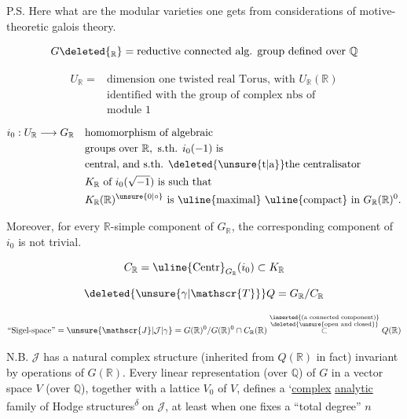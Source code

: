 P.S. Here what are the modular varieties one gets from considerations of motive-theoretic galois theory.

\[
G\deleted{_{\mathbb{R}}}
= \text{reductive connected alg. group defined over }\mathbb{Q}
\]

\[
\begin{aligned}
U_{\mathbb{R}}={}&\text{dimension one twisted real Torus, with }U_{\mathbb{R}}(\mathbb{R})\\
&\text{identified with the group of complex nbs of}\\
&\text{module }1
\end{aligned}
\]

\[
\begin{aligned}
i_0:U_{\mathbb{R}}\longrightarrow G_{\mathbb{R}}\quad &\text{homomorphism of algebraic}\\
&\text{groups over }\mathbb{R},\ \text{s.th. }i_0(-1)\text{ is}\\
&\text{central, and s.th. \deleted{\unsure{t|a}}the centralisator}\\
&K_{\mathbb{R}}\text{ of }i_0(\sqrt{-1})\text{ is such that}\\
&K_{\mathbb{R}}(\mathbb{R})^{\unsure{0|\circ}}\text{ is \uline{maximal} \uline{compact} in }G_{\mathbb{R}}(\mathbb{R})^{0}.
\end{aligned}
\]

Moreover, for every $\mathbb{R}$-simple component of $G_{\mathbb{R}}$, the corresponding component of $i_0$ is not trivial.

\[
C_{\mathbb{R}}=\text{\uline{Centr}}_{G_{\mathbb{R}}}(i_0)\subset K_{\mathbb{R}}
\]

\[
\deleted{\unsure{\gamma|\mathscr{T}}}Q=G_{\mathbb{R}}/C_{\mathbb{R}}
\]

\[
\text{``Sigel-space''}=\unsure{\mathscr{J}|\mathcal{J}|\gamma}=G(\mathbb{R})^{0}/G(\mathbb{R})^{0}\cap C_{\mathbb{R}}(\mathbb{R})
\overset{\substack{\inserted{\text{(a connected component)}}\\ \deleted{\text{\unsure{open and closed}}}}}{\subset}Q(\mathbb{R})
\]

N.B. $\mathscr{J}$ has a natural complex structure (inherited from  $Q(\mathbb{R})$ in fact) invariant by operations of $G(\mathbb{R})$. Every linear representation (over $\mathbb{Q}$) of $G$ in a vector space $V$ (over $\mathbb{Q}$), together with a lattice $V_0$ of $V$, defines a `\uline{complex} \uline{analytic} family  of Hodge structures\textsuperscript{\ensuremath{\delta}} on $\mathscr{J}$, at least when one fixes a ``total degree'' $n$
